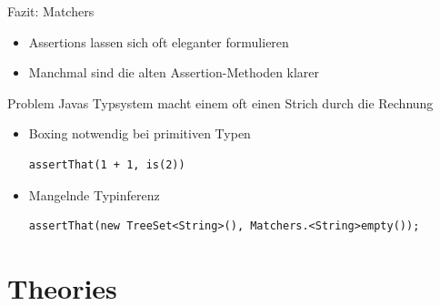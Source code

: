 \begin{frame}[fragile]{Fazit: Matchers}
	\begin{itemize}
		\item Assertions lassen sich oft eleganter formulieren
		\item Manchmal sind die alten Assertion-Methoden klarer
	\end{itemize}
	\begin{block}{Problem}
		Javas Typsystem macht einem oft einen Strich durch die Rechnung
		\begin{itemize}
			\item Boxing notwendig bei primitiven Typen \begin{lstlisting}
assertThat(1 + 1, is(2))
\end{lstlisting}
			\item Mangelnde Typinferenz \begin{lstlisting}
assertThat(new TreeSet<String>(), Matchers.<String>empty());
\end{lstlisting}
		\end{itemize}
	\end{block}
\end{frame}

{
\date{Wassily Kandinsky, Composition VIII}
\part{Theories}
}

